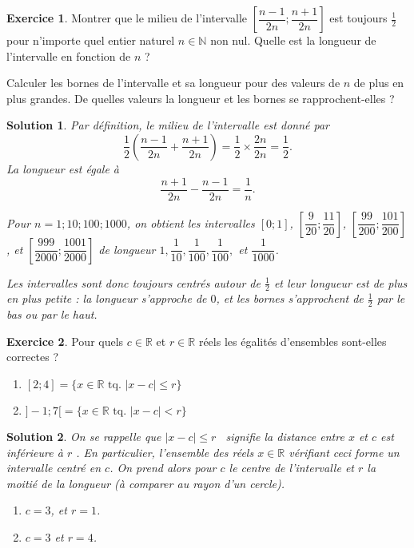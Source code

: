 \documentclass[a4paper, 14pt]{extarticle}
\theoremstyle{plain}
\newtheorem*{sol}{Solution}
\theoremstyle{definition}
\newtheorem{ex}{Exercice}
\newcommand{\R}{\mathbb{R}}
\newcommand{\N}{\mathbb{N}}
\newcommand{\exe}[2]{
		\begin{ex} #1  \end{ex}
		\begin{sol} #2 \end{sol}
	}
\newcommand{\exe}[2]{
		\begin{ex} #1  \end{ex}
	}
\begin{document}
\exe{
	Montrer que le milieu de l'intervalle $\left[\dfrac{n-1}{2n} ; \dfrac{n+1}{2n}\right]$ est toujours $\frac12$ pour n'importe quel entier naturel $n\in\N$ non nul. Quelle est la longueur de l'intervalle en fonction de $n$ ?
	
	Calculer les bornes de l'intervalle et sa longueur pour des valeurs de $n$ de plus en plus grandes. De quelles valeurs la longueur et les bornes se rapprochent-elles ?
}{
	Par définition, le milieu de l'intervalle est donné par
		\[ \dfrac12 \left( \dfrac{n-1}{2n} + \dfrac{n+1}{2n} \right)  =\dfrac12 \times \dfrac{2n}{2n} = \dfrac12. \]
	La longueur est égale à
		\[\dfrac{n+1}{2n} -  \dfrac{n-1}{2n} = \dfrac{1}{n}. \]
	
	Pour $n=1; 10; 100; 1000$, on obtient les intervalles $[0;1]$, $\left[\dfrac9{20}; \dfrac{11}{20}\right]$, $\left[\dfrac{99}{200};\dfrac{101}{200}\right]$, et $\left[\dfrac{999}{2000} ; \dfrac{1001}{2000}\right]$ de longueur $1, \dfrac1{10}, \dfrac1{100}, \dfrac1{100},$ et $\dfrac1{1000}$.
	
	Les intervalles sont donc toujours centrés autour de $\frac12$ et leur longueur est de plus en plus petite : la longueur s'approche de $0$, et les bornes s'approchent de $\frac12$ par le bas ou par le haut.

}

\exe{
	Pour quels $c \in\R$ et $r \in \R$ réels les égalités d'ensembles sont-elles correctes ?
	\ifdys
	\else
	\begin{multicols}{2}
	\fi
	\begin{enumerate}
		\item $[2 ; 4] = \{ x \in \R \text{ tq. } |x - c| \leq r \}$
		\item $]{-}1 ; 7[ = \{ x \in \R \text{ tq. } |x - c| < r \}$
	\end{enumerate}
	\ifdys
	\else
	\end{multicols}
	\fi
}{

On se rappelle que \og $|x-c| \leq r$ \fg \ signifie \og la distance entre $x$ et $c$ est inférieure à $r$ \fg. 
En particulier, l'ensemble des réels $x\in\R$ vérifiant ceci forme un intervalle centré en $c$.
On prend alors pour $c$ le centre de l'intervalle et $r$ la moitié de la longueur (à comparer au rayon d'un cercle).
	\ifdys
	\else
	\begin{multicols}{2}
	\fi
	\begin{enumerate}
		\item $c=3$, et $r=1$.
		\item $c = 3$ et $r=4$.
	\end{enumerate}
	\ifdys
	\else
	\end{multicols}
	\fi

}
\end{document}
